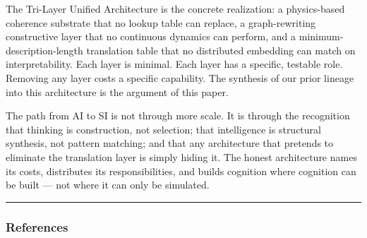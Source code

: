 \documentclass[
  11pt,
  a4paper,
]{article}
\begin{document}
The Tri-Layer Unified Architecture is the concrete realization: a
physics-based coherence substrate that no lookup table can replace, a
graph-rewriting constructive layer that no continuous dynamics can
perform, and a minimum-description-length translation table that no
distributed embedding can match on interpretability. Each layer is
minimal. Each layer has a specific, testable role. Removing any layer
costs a specific capability. The synthesis of our prior lineage into
this architecture is the argument of this paper.

The path from AI to SI is not through more scale. It is through the
recognition that thinking is construction, not selection; that
intelligence is structural synthesis, not pattern matching; and that any
architecture that pretends to eliminate the translation layer is simply
hiding it. The honest architecture names its costs, distributes its
responsibilities, and builds cognition where cognition can be built ---
not where it can only be simulated.

\begin{center}\rule{0.5\linewidth}{0.5pt}\end{center}

\subsubsection{References}\label{references}
\end{document}
